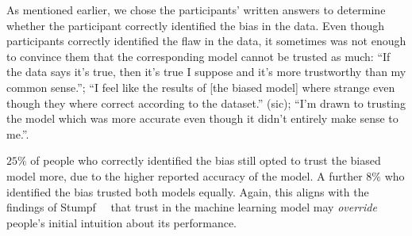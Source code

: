 As mentioned earlier, we chose the participants' written answers to determine whether the participant correctly identified the bias in the data.
Even though participants correctly identified the flaw in the data, it sometimes was not enough to convince them that the corresponding model cannot be trusted as much:
``If the data says it's true, then it's true I suppose and it's more trustworthy than my common sense.'';
``I feel like the results of [the biased model] where strange even though they where correct according to the dataset.'' (sic);
``I'm drawn to trusting the model which was more accurate even though it didn't entirely make sense to me.''.

$25\%$ of people who correctly identified the bias still opted to trust the biased model more, due to the higher reported accuracy of the model.
A further $8\%$ who identified the bias trusted both models equally.
Again, this aligns with the findings of Stumpf~\etal~\cite{harmful} that trust in the machine learning model may \emph{override} people's initial intuition about its performance.

